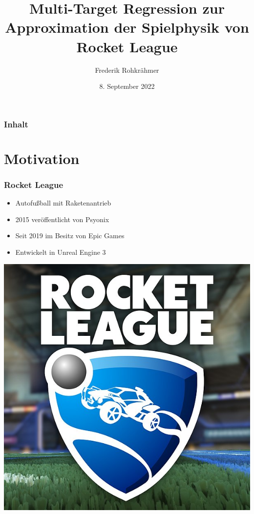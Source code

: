 \documentclass{beamer}
\author[F. Rohkrähmer]{Frederik Rohkrähmer}
\title[Fakultät für Informatik]{Multi-Target Regression zur Approximation der Spielphysik von Rocket League}
\date{8. September 2022}
\institute[Lehrstuhl 11]{TU Dortmund}
\begin{document}

\begin{frame}
\titlepage
\end{frame}

\begin{frame}
\frametitle{Inhalt}
\tableofcontents
\end{frame}

 \section{Motivation}
\begin{frame}
\frametitle{Rocket League}
\begin{minipage}[c]{0.5\textwidth}
\begin{itemize}
\item Autofußball mit Raketenantrieb
\item 2015 veröffentlicht von Psyonix
\item Seit 2019 im Besitz von Epic Games
\item Entwickelt in Unreal Engine 3
\end{itemize}
\end{minipage}
\begin{minipage}[c]{0.48\textwidth}
\includegraphics[width=\textwidth]{Rocket_League_logo.jpg}
\end{minipage}
\end{frame}
\end{document}
